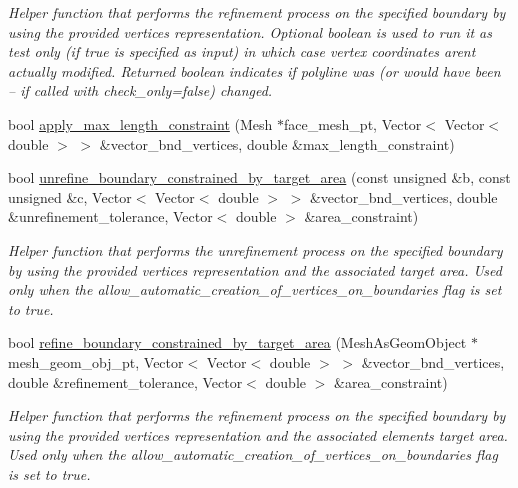 \begin{DoxyCompactItemize}
\begin{DoxyCompactList}\small\item\em Helper function that performs the refinement process on the specified boundary by using the provided vertices representation. Optional boolean is used to run it as test only (if true is specified as input) in which case vertex coordinates aren\textquotesingle{}t actually modified. Returned boolean indicates if polyline was (or would have been -- if called with check\+\_\+only=false) changed. \end{DoxyCompactList}\item 
bool \hyperlink{classoomph_1_1RefineableTriangleMesh_abcfd90d11b4bc87de160736c0542d65c}{apply\+\_\+max\+\_\+length\+\_\+constraint} (Mesh $\ast$face\+\_\+mesh\+\_\+pt, Vector$<$ Vector$<$ double $>$ $>$ \&vector\+\_\+bnd\+\_\+vertices, double \&max\+\_\+length\+\_\+constraint)
\item 
bool \hyperlink{classoomph_1_1RefineableTriangleMesh_ad06aa82d81a16d5948b4317608a67aae}{unrefine\+\_\+boundary\+\_\+constrained\+\_\+by\+\_\+target\+\_\+area} (const unsigned \&b, const unsigned \&c, Vector$<$ Vector$<$ double $>$ $>$ \&vector\+\_\+bnd\+\_\+vertices, double \&unrefinement\+\_\+tolerance, Vector$<$ double $>$ \&area\+\_\+constraint)
\begin{DoxyCompactList}\small\item\em Helper function that performs the unrefinement process on the specified boundary by using the provided vertices representation and the associated target area. Used only when the \textquotesingle{}allow\+\_\+automatic\+\_\+creation\+\_\+of\+\_\+vertices\+\_\+on\+\_\+boundaries\textquotesingle{} flag is set to true. \end{DoxyCompactList}\item 
bool \hyperlink{classoomph_1_1RefineableTriangleMesh_abd9edf3c6c57a337301abe8828ca0567}{refine\+\_\+boundary\+\_\+constrained\+\_\+by\+\_\+target\+\_\+area} (Mesh\+As\+Geom\+Object $\ast$mesh\+\_\+geom\+\_\+obj\+\_\+pt, Vector$<$ Vector$<$ double $>$ $>$ \&vector\+\_\+bnd\+\_\+vertices, double \&refinement\+\_\+tolerance, Vector$<$ double $>$ \&area\+\_\+constraint)
\begin{DoxyCompactList}\small\item\em Helper function that performs the refinement process on the specified boundary by using the provided vertices representation and the associated elements target area. Used only when the \textquotesingle{}allow\+\_\+automatic\+\_\+creation\+\_\+of\+\_\+vertices\+\_\+on\+\_\+boundaries\textquotesingle{} flag is set to true. \end{DoxyCompactList}\item 

\end{DoxyCompactItemize}
